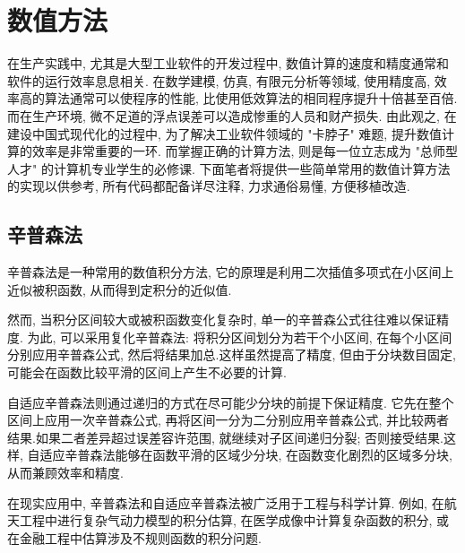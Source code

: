\documentclass[a4paper]{ctexbook}
\begin{document}


\chapter{数值方法}

在生产实践中, 尤其是大型工业软件的开发过程中, 数值计算的速度和精度通常和软件的运行效率息息相关. 在数学建模, 仿真, 有限元分析等领域, 使用精度高, 效率高的算法通常可以使程序的性能, 比使用低效算法的相同程序提升十倍甚至百倍. 而在生产环境, 微不足道的浮点误差可以造成惨重的人员和财产损失. 由此观之, 在建设中国式现代化的过程中, 为了解决工业软件领域的 "卡脖子" 难题, 提升数值计算的效率是非常重要的一环. 而掌握正确的计算方法, 则是每一位立志成为 "总师型人才" 的计算机专业学生的必修课. 下面笔者将提供一些简单常用的数值计算方法的实现以供参考, 所有代码都配备详尽注释, 力求通俗易懂, 方便移植改造.

\section{辛普森法}

辛普森法是一种常用的数值积分方法, 它的原理是利用二次插值多项式在小区间上近似被积函数, 从而得到定积分的近似值.

然而, 当积分区间较大或被积函数变化复杂时, 单一的辛普森公式往往难以保证精度. 为此, 可以采用复化辛普森法: 将积分区间划分为若干个小区间, 在每个小区间分别应用辛普森公式, 然后将结果加总.这样虽然提高了精度, 但由于分块数目固定, 可能会在函数比较平滑的区间上产生不必要的计算.

自适应辛普森法则通过递归的方式在尽可能少分块的前提下保证精度. 它先在整个区间上应用一次辛普森公式, 再将区间一分为二分别应用辛普森公式, 并比较两者结果.如果二者差异超过误差容许范围, 就继续对子区间递归分裂; 否则接受结果.这样, 自适应辛普森法能够在函数平滑的区域少分块, 在函数变化剧烈的区域多分块, 从而兼顾效率和精度.

在现实应用中, 辛普森法和自适应辛普森法被广泛用于工程与科学计算. 例如, 在航天工程中进行复杂气动力模型的积分估算, 在医学成像中计算复杂函数的积分, 或在金融工程中估算涉及不规则函数的积分问题.


\end{document}
